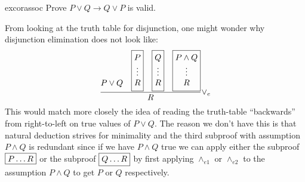 \begin{restatable}{exc}{orassoc}
  Prove $P \vee Q \rightarrow Q \vee P$ is valid.
\end{restatable}

\begin{remark}
  From looking at the truth table for disjunction, one might wonder
  why disjunction elimination does not look like:
\begin{align*}
\setlength{\arraycolsep}{0em}
\dfrac{\begin{array}{c} \\ \\[0.7em] P \vee Q\end{array} \quad
\fbox{$\begin{array}{c} P \\ \vdots \\ R\end{array}$}
\quad
\fbox{$\begin{array}{c} Q \\ \vdots \\ R\end{array}$}
  \quad
  \fbox{$\begin{array}{c} P \wedge Q \\ \vdots \\ R\end{array}$}}{R}
{\vee_e}
\end{align*}
  This would match more closely the idea of reading the truth-table
  ``backwards'' from right-to-left on true values of $P \vee Q$. The
  reason we don't have this is that natural deduction strives for
  minimality and the third subproof with assumption $P \wedge Q$ is
  redundant since if we have $P \wedge Q$ true we can apply
  either the subproof $\fbox{$P \ldots R$}$ or the subproof
  $\fbox{$Q \ldots R$}$ by first applying $\wedge_{e1}$ or
  $\wedge_{e2}$ to the assumption $P \wedge Q$ to get $P$ or $Q$ respectively.

\end{remark}
